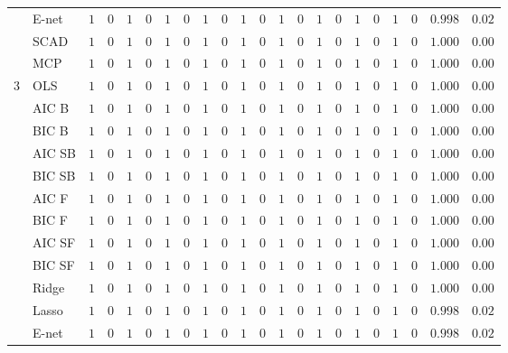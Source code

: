 \begin{tabular}{ll|ll|llllll|llllll|llllll}
	& E-net  & $1$ & $0$ & $1$ & $0$ & $1$ & $0$ & $1$ & $0$ & $1$ & $0$ & $1$ & $0$ & $1$ & $0$ & $1$ & $0$ & $1$ & $0$ & $0.998$ & $0.02$ \\
	& SCAD  & $1$ & $0$ & $1$ & $0$ & $1$ & $0$ & $1$ & $0$ & $1$ & $0$ & $1$ & $0$ & $1$ & $0$ & $1$ & $0$ & $1$ & $0$ & $1.000$ & $0.00$ \\
	& MCP  & $1$ & $0$ & $1$ & $0$ & $1$ & $0$ & $1$ & $0$ & $1$ & $0$ & $1$ & $0$ & $1$ & $0$ & $1$ & $0$ & $1$ & $0$ & $1.000$ & $0.00$ \\\hline
	3 & OLS  & $1$ & $0$ & $1$ & $0$ & $1$ & $0$ & $1$ & $0$ & $1$ & $0$ & $1$ & $0$ & $1$ & $0$ & $1$ & $0$ & $1$ & $0$ & $1.000$ & $0.00$ \\
	& AIC B  & $1$ & $0$ & $1$ & $0$ & $1$ & $0$ & $1$ & $0$ & $1$ & $0$ & $1$ & $0$ & $1$ & $0$ & $1$ & $0$ & $1$ & $0$ & $1.000$ & $0.00$ \\
	& BIC B  & $1$ & $0$ & $1$ & $0$ & $1$ & $0$ & $1$ & $0$ & $1$ & $0$ & $1$ & $0$ & $1$ & $0$ & $1$ & $0$ & $1$ & $0$ & $1.000$ & $0.00$ \\
	& AIC SB  & $1$ & $0$ & $1$ & $0$ & $1$ & $0$ & $1$ & $0$ & $1$ & $0$ & $1$ & $0$ & $1$ & $0$ & $1$ & $0$ & $1$ & $0$ & $1.000$ & $0.00$ \\
	& BIC SB  & $1$ & $0$ & $1$ & $0$ & $1$ & $0$ & $1$ & $0$ & $1$ & $0$ & $1$ & $0$ & $1$ & $0$ & $1$ & $0$ & $1$ & $0$ & $1.000$ & $0.00$ \\
	& AIC F  & $1$ & $0$ & $1$ & $0$ & $1$ & $0$ & $1$ & $0$ & $1$ & $0$ & $1$ & $0$ & $1$ & $0$ & $1$ & $0$ & $1$ & $0$ & $1.000$ & $0.00$ \\
	& BIC F  & $1$ & $0$ & $1$ & $0$ & $1$ & $0$ & $1$ & $0$ & $1$ & $0$ & $1$ & $0$ & $1$ & $0$ & $1$ & $0$ & $1$ & $0$ & $1.000$ & $0.00$ \\
	& AIC SF  & $1$ & $0$ & $1$ & $0$ & $1$ & $0$ & $1$ & $0$ & $1$ & $0$ & $1$ & $0$ & $1$ & $0$ & $1$ & $0$ & $1$ & $0$ & $1.000$ & $0.00$ \\
	& BIC SF  & $1$ & $0$ & $1$ & $0$ & $1$ & $0$ & $1$ & $0$ & $1$ & $0$ & $1$ & $0$ & $1$ & $0$ & $1$ & $0$ & $1$ & $0$ & $1.000$ & $0.00$ \\
	& Ridge  & $1$ & $0$ & $1$ & $0$ & $1$ & $0$ & $1$ & $0$ & $1$ & $0$ & $1$ & $0$ & $1$ & $0$ & $1$ & $0$ & $1$ & $0$ & $1.000$ & $0.00$ \\
	& Lasso  & $1$ & $0$ & $1$ & $0$ & $1$ & $0$ & $1$ & $0$ & $1$ & $0$ & $1$ & $0$ & $1$ & $0$ & $1$ & $0$ & $1$ & $0$ & $0.998$ & $0.02$ \\
	& E-net  & $1$ & $0$ & $1$ & $0$ & $1$ & $0$ & $1$ & $0$ & $1$ & $0$ & $1$ & $0$ & $1$ & $0$ & $1$ & $0$ & $1$ & $0$ & $0.998$ & $0.02$ \\

\end{tabular}

